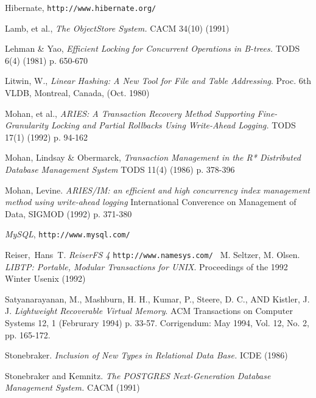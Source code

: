 \documentclass[10pt,letterpaper,twocolumn,english]{article}
\begin{document}
\begin{thebibliography}{99}
\begin{small}
 Hibernate, {\tt http://www.hibernate.org/}

 Lamb, et al., {\em The ObjectStore System.} CACM 34(10) (1991)

 Lehman \& Yao, {\em Efficient Locking for Concurrent Operations in B-trees.} TODS 6(4) (1981) p. 650-670

 Litwin, W., {\em Linear Hashing: A New Tool for File and Table Addressing}. Proc. 6th VLDB, Montreal, Canada, (Oct. 1980) %

 Mohan, et al., {\em ARIES: A Transaction Recovery Method Supporting Fine-Granularity Locking and Partial Rollbacks Using Write-Ahead Logging.} TODS 17(1) (1992) p. 94-162

 Mohan, Lindsay \& Obermarck, {\em Transaction Management in the R* Distributed Database Management System} TODS 11(4) (1986) p. 378-396

 Mohan, Levine. {\em ARIES/IM: an efficient and high concurrency index management method using write-ahead logging} International Converence on Management of Data, SIGMOD (1992) p. 371-380

 {\em MySQL}, {\tt http://www.mysql.com/ }

 Reiser,~Hans~T. {\em ReiserFS 4} {\tt http://www.namesys.com/ }
%
 M. Seltzer, M. Olsen. {\em LIBTP: Portable, Modular Transactions for UNIX}. Proceedings of the 1992 Winter Usenix (1992)

 Satyanarayanan, M., Mashburn, H. H., Kumar, P., Steere, D. C., AND Kistler, J. J. {\em Lightweight Recoverable Virtual Memory}. ACM Transactions on Computer Systems 12, 1 (Februrary 1994) p. 33-57. Corrigendum: May 1994, Vol. 12, No. 2, pp. 165-172.

 Stonebraker. {\em Inclusion of New Types in Relational Data Base. } ICDE (1986) %

 Stonebraker and Kemnitz. {\em The POSTGRES Next-Generation Database Management System. } CACM (1991)

%
%



\end{small}
\end{thebibliography}
\end{document}

